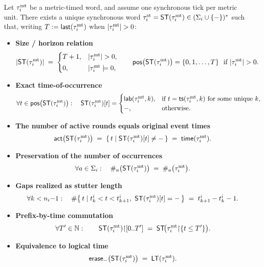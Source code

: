 \documentclass{article}
\begin{document}
  \begin{lemma}
  Let \(\tau^{\mathrm{mt}}_i\) be a metric-timed word, and assume one synchronous tick per metric unit.
  There exists a unique synchronous word \(\tau^{\mathrm{st}}_i=\mathsf{ST}(\tau^{\mathrm{mt}}_i)\in(\Sigma_i\cup\{-\})^{*}\) such that, writing \(T:=\mathsf{last}(\tau^{\mathrm{mt}}_i)\) when \(|\taumt_i|>0\):
  \begin{itemize}
    \item \textbf{Size / horizon relation}\\[2pt]
    \[
    |\ST(\taumt_i)| \;=\;
    \begin{cases}
    T+1, & |\taumt_i|>0,\\[2pt]
    0,   & |\taumt_i|=0,
    \end{cases}
    \qquad
    \mathsf{pos}\big(\ST(\taumt_i)\big)=\{0,1,\dots,T\}\ \text{ if }|\taumt_i|>0.
    \]
    \item \textbf{Exact time-of-occurrence}\\[2pt]
    \[
    \forall t\in \mathsf{pos}\big(\mathsf{ST}(\tau^{\mathrm{mt}}_i)\big):\quad
    \mathsf{ST}(\tau^{\mathrm{mt}}_i)[t]=
    \begin{cases}
    \mathsf{lab}(\tau^{\mathrm{mt}}_i,k), & \text{if } t=\mathsf{ts}(\tau^{\mathrm{mt}}_i,k)\ \text{for some unique }k,\\
    -, & \text{otherwise.}
    \end{cases}
    \]
    \item \textbf{The number of active rounds equals original event times}\\[2pt]
    \[
    \mathsf{act}\big(\mathsf{ST}(\tau^{\mathrm{mt}}_i)\big)\;=\;\{\,t\mid \mathsf{ST}(\tau^{\mathrm{mt}}_i)[t]\neq -\,\}\;=\;\mathsf{time}(\tau^{\mathrm{mt}}_i).
    \]
    \item \textbf{Preservation of the number of occurrences}\\[2pt]
    \[
    \forall a\in\Sigma_i:\quad \#_{a}\big(\mathsf{ST}(\tau^{\mathrm{mt}}_i)\big)\;=\;\#_{a}\big(\tau^{\mathrm{mt}}_i\big).
    \]
    \item \textbf{Gaps realized as stutter length}\\[2pt]
    \[
    \forall k<n_i{-}1:\quad 
    \#\big\{\,t\mid t^i_k<t<t^i_{k+1},\ \ST(\taumt_i)[t]=-\,\big\}\;=\; t^i_{k+1}-t^i_k-1.
    \]
    \item \textbf{Prefix-by-time commutation}\\[2pt]
    \[
    \forall T'\in\mathbb{N}:\qquad
    \mathsf{ST}(\tau^{\mathrm{mt}}_i){\upharpoonright}[0..T'] \;=\; \mathsf{ST}\!\big(\tau^{\mathrm{mt}}_i{\upharpoonright}\{t\le T'\}\big).
    \]
    \item \textbf{Equivalence to logical time}\\[2pt]
    \[
    \mathsf{erase}_{-}\big(\mathsf{ST}(\tau^{\mathrm{mt}}_i)\big)\;=\;\mathsf{LT}(\tau^{\mathrm{mt}}_i).
    \]
  \end{itemize}
  \end{lemma}
  
\end{document}
